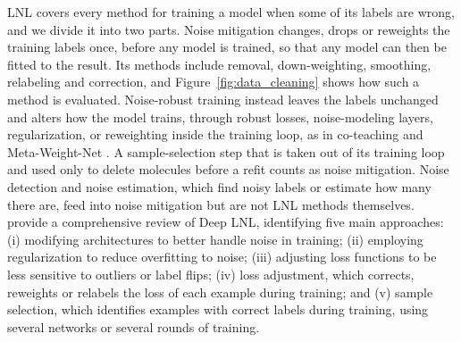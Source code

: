 LNL covers every method for training a model when some of its labels are wrong, and we divide it into two parts. Noise mitigation changes, drops or reweights the training labels once, before any model is trained, so that any model can then be fitted to the result. Its methods include removal, down-weighting, smoothing, relabeling and correction, and Figure~\ref{fig:data_cleaning} shows how such a method is evaluated. Noise-robust training instead leaves the labels unchanged and alters how the model trains, through robust losses, noise-modeling layers, regularization, or reweighting inside the training loop, as in co-teaching \citep{Han2018} and Meta-Weight-Net \citep{shu2019metaweightnet}. A sample-selection step that is taken out of its training loop and used only to delete molecules before a refit counts as noise mitigation. Noise detection and noise estimation, which find noisy labels or estimate how many there are, feed into noise mitigation but are not LNL methods themselves. \citet{Song2022} provide a comprehensive review of Deep LNL, identifying five main approaches: (i) modifying architectures to better handle noise in training; (ii) employing regularization to reduce overfitting to noise; (iii) adjusting loss functions to be less sensitive to outliers or label flips; (iv) loss adjustment, which corrects, reweights or relabels the loss of each example during training; and (v) sample selection, which identifies examples with correct labels during training, using several networks or several rounds of training.

